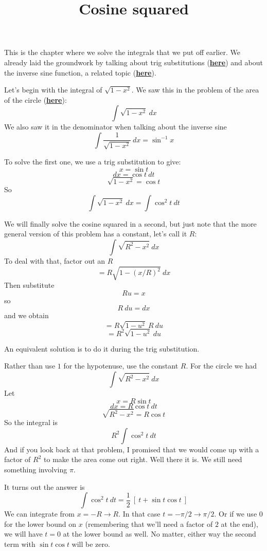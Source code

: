 \documentclass[11pt, oneside]{article}
\title{Cosine squared}
\date{}
\begin{document}
\maketitle
\Large

\label{sec:Cosine_squared}

This is the chapter where we solve the integrals that we put off earlier.  We already laid the groundwork by talking about trig substitutions (\hyperref[sec:Techniques_of_integration]{\textbf{here}}) and about the inverse sine function, a related topic (\hyperref[sec:Inverse_trig]{\textbf{here}}).

Let's begin with the integral of $\sqrt{1 - x^2}$.  We saw this in the problem of the area of the circle (\hyperref[sec:Easy_pieces]{\textbf{here}}):
\[ \int \sqrt{1 - x^2} \ dx \]
We also saw it in the denominator when talking about the inverse sine
\[ \int \frac{1}{\sqrt{1 - x^2}} \ dx = \sin^{-1} x \]

To solve the first one, we use a trig substitution to give:
\[ x = \sin t \]
\[ dx = \cos t \ dt \]
\[ \sqrt{1-x^2} = \cos t \]
So
\[ \int \sqrt{1 - x^2} \ dx = \int \cos^2 t \ dt \]

We will finally solve the cosine squared in a second, but just note that the more general version of this problem has a constant, let's call it $R$:
\[ \int \sqrt{R^2 - x^2} \ dx \]
To deal with that, factor out an $R$
\[ = R \sqrt{1 - (x/R)^2} \ dx \]
Then substitute 
\[ Ru = x \]
 so 
 \[ R \ du = dx \]
 and we obtain
\[ = R \sqrt{1 - u^2} \ R \ du \]
\[ = R^2 \sqrt{1 - u^2}  \ du  \]

An equivalent solution is to do it during the trig substitution.

Rather than use $1$ for the hypotenuse, use the constant $R$.  For the circle we had
\[ \int \sqrt{R^2 - x^2} \ dx \]
Let 
\[ x = R \sin t \]
\[ dx = R \cos t \ dt \]
\[ \sqrt{R^2 - x^2} = R \cos t \]
So the integral is
\[ R^2 \int \cos^2 t \ dt \]
And if you look back at that problem, I promised that we would come up with a factor of $R^2$ to make the area come out right.  Well there it is.  We still need something involving $\pi$.

It turns out the answer is 
\[ \int \cos^2 t \ dt = \frac{1}{2} \ [ \ t + \sin t \cos t \ ]  \]
We can integrate from $x = -R \rightarrow R$.  In that case $t = -\pi/2 \rightarrow \pi/2$.  Or if we  use $0$ for the lower bound on $x$ (remembering that we'll need a factor of $2$ at the end), we will have $t = 0$ at the lower bound as well.  No matter, either way the second term with $\sin t \cos t$ will be zero.  
\end{document}
